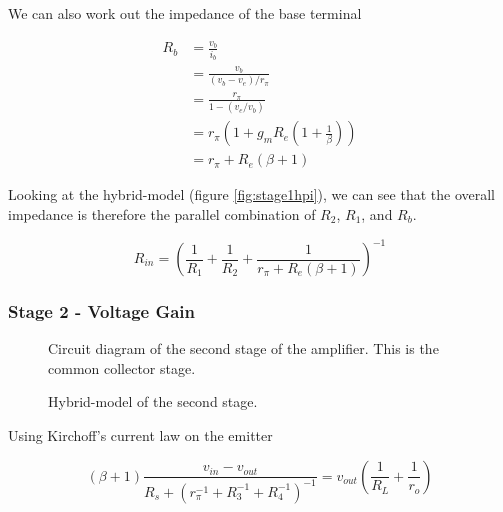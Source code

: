 \documentclass[a4paper,11pt]{article}
\begin{document}
            We can also work out the impedance of the base terminal
            
            \begin{subequations}
            \begin{align}
                R_b &= \frac{v_b}{i_b}\\
                    &= \frac{v_b}{(v_b - v_e) / r_{\pi}}\\
                    &= \frac{r_{\pi}}{1 - (v_e / v_b)}\\
                    &= r_{\pi} \left( 1 + g_m R_e \left( 1 + \frac{1}{\beta} \right) \right)\\
                    &= r_{\pi} + R_e (\beta + 1)
            \end{align}
            \end{subequations}
            
            Looking at the hybrid-\textpi model (figure \ref{fig:stage1hpi}), we can see that the overall impedance is therefore the parallel combination of $R_2$, $R_1$, and $R_b$.
            
            \begin{equation}
                R_{in} = \left( \frac{1}{R_1} + \frac{1}{R_2} + \frac{1}{r_{\pi} + R_e (\beta + 1)} \right) ^{-1}
            \end{equation}
            
        \newpage
        \subsubsection{Stage 2 - Voltage Gain}
            \begin{figure}[h]
            \centering
                
                \caption{Circuit diagram of the second stage of the amplifier. This is the common collector stage.}
                \label{fig:stage2}
            \end{figure}
            
            \begin{figure}[h]
            \centering
                
                \caption{Hybrid-\textpi model of the second stage.}
                \label{fig:stage2hpi}
            \end{figure}
            
            Using Kirchoff's current law on the emitter
            
            \begin{equation}
                (\beta + 1) \frac{v_{in} - v_{out}}{R_s + \left( r_{\pi}^{-1} + R_{3}^{-1} + R_{4}^{-1} \right)^{-1}} = v_{out} \left( \frac{1}{R_L} + \frac{1}{r_o} \right)
            \end{equation}
            
\end{document}
